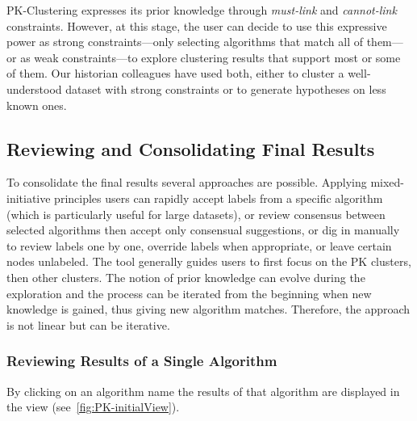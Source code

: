 PK-Clustering expresses its prior knowledge through \emph{must-link} and \emph{cannot-link} constraints. However, at this stage, the user can decide to use this expressive power as strong constraints---only selecting algorithms that match all of them---or as weak constraints---to explore clustering results that support most or some of them. Our historian colleagues have used both, either to cluster a well-understood dataset with strong constraints or to generate hypotheses on less known ones.


\subsection{Reviewing and Consolidating Final Results }
To consolidate the final results several approaches are possible. Applying mixed-initiative principles users can rapidly accept labels from a specific algorithm (which is particularly useful for large datasets), or review consensus between selected algorithms then accept only consensual suggestions, or dig in manually to review labels one by one, override labels when appropriate, or leave certain nodes unlabeled.  The tool generally  guides users to first focus on the PK clusters, then other clusters.
The notion of prior knowledge can evolve during the exploration and the process can be iterated from the beginning when new knowledge is gained, thus giving new algorithm matches. Therefore, the approach is not linear but can be iterative.

\subsubsection{Reviewing Results of a Single Algorithm}
By clicking on an algorithm name the results of that algorithm are displayed in the \paovis view (see~\autoref{fig:PK-initialView}). 

